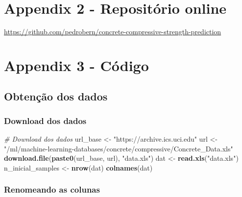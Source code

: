 \documentclass[]{article}
\newenvironment{Shaded}{\begin{snugshade}}{\end{snugshade}}
\newcommand{\CommentTok}[1]{\textcolor[rgb]{0.56,0.35,0.01}{\textit{#1}}}
\newcommand{\KeywordTok}[1]{\textcolor[rgb]{0.13,0.29,0.53}{\textbf{#1}}}
\newcommand{\NormalTok}[1]{#1}
\newcommand{\StringTok}[1]{\textcolor[rgb]{0.31,0.60,0.02}{#1}}
\begin{document}
\hypertarget{appendix2}{%
\section{Appendix 2 - Repositório online}\label{appendix2}}

\url{https://github.com/pedrobern/concrete-compressive-strength-prediction}
\newpage

\hypertarget{appendix3}{%
\section{Appendix 3 - Código}\label{appendix3}}

\hypertarget{obtenuxe7uxe3o-dos-dados-1}{%
\subsection{Obtenção dos dados}\label{obtenuxe7uxe3o-dos-dados-1}}

\hypertarget{download-dos-dados}{%
\subsubsection{Download dos dados}\label{download-dos-dados}}

\label{show-download-data}

\begin{Shaded}
\begin{Highlighting}[]
\CommentTok{# Download dos dados}
\NormalTok{url_base <-}\StringTok{ "https://archive.ics.uci.edu"}
\NormalTok{url <-}\StringTok{  "/ml/machine-learning-databases/concrete/compressive/Concrete_Data.xls"}
\KeywordTok{download.file}\NormalTok{(}\KeywordTok{paste0}\NormalTok{(url_base, url), }\StringTok{"data.xls"}\NormalTok{)}
\NormalTok{dat <-}\StringTok{ }\KeywordTok{read.xls}\NormalTok{(}\StringTok{"data.xls"}\NormalTok{)}
\NormalTok{n_inicial_samples <-}\StringTok{ }\KeywordTok{nrow}\NormalTok{(dat)}
\KeywordTok{colnames}\NormalTok{(dat)}
\end{Highlighting}
\end{Shaded}

\hypertarget{renomeando-as-colunas}{%
\subsubsection{Renomeando as colunas}\label{renomeando-as-colunas}}

\label{show-rename-dat-cols}
\end{document}
